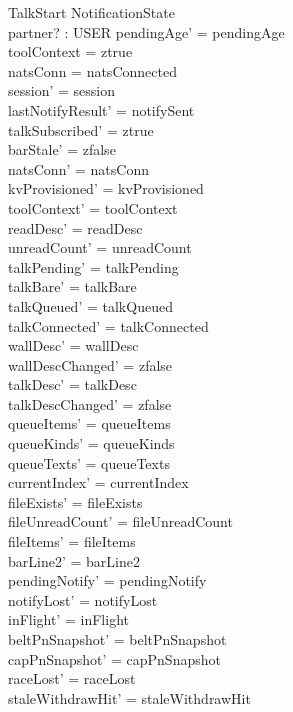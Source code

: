 \documentclass[a4paper,10pt,fleqn]{article}
\begin{document}
\begin{schema}{TalkStart}
  \Delta NotificationState \\
  partner? : USER
  \where
  pendingAge' = pendingAge \\
  toolContext = ztrue \\
  natsConn = natsConnected \\
  session' = session \\
  lastNotifyResult' = notifySent \\
  talkSubscribed' = ztrue \\
  barStale' = zfalse \\
  natsConn' = natsConn \\
  kvProvisioned' = kvProvisioned \\
  toolContext' = toolContext \\
  readDesc' = readDesc \\
  unreadCount' = unreadCount \\
  talkPending' = talkPending \\
  talkBare' = talkBare \\
  talkQueued' = talkQueued \\
  talkConnected' = talkConnected \\
  wallDesc' = wallDesc \\
  wallDescChanged' = zfalse \\
  talkDesc' = talkDesc \\
  talkDescChanged' = zfalse \\
  queueItems' = queueItems \\
  queueKinds' = queueKinds \\
  queueTexts' = queueTexts \\
  currentIndex' = currentIndex \\
  fileExists' = fileExists \\
  fileUnreadCount' = fileUnreadCount \\
  fileItems' = fileItems \\
  barLine2' = barLine2 \\
  pendingNotify' = pendingNotify \\
  notifyLost' = notifyLost \\
  inFlight' = inFlight \\
  beltPnSnapshot' = beltPnSnapshot \\
  capPnSnapshot' = capPnSnapshot \\
  raceLost' = raceLost \\
  staleWithdrawHit' = staleWithdrawHit \\

\end{schema}
\end{document}
